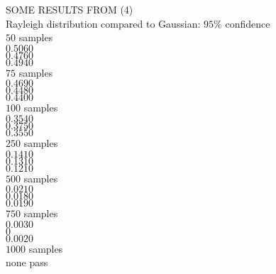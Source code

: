 \documentclass[12pt]{article}
\begin{document}
SOME RESULTS FROM (4)
\\Rayleigh distribution compared to Gaussian: $95\%$ confidence
\\$50$ samples
\\	$0.5060$
\\	$0.4760$
\\	$0.4940$
\\$75$ samples
\\	$0.4690$
\\	$0.4480$
\\	$0.4400$
\\$100$ samples
\\	$0.3540$
\\	$0.3750$
\\	$0.3550$
\\$250$ samples
\\	$0.1410$
\\	$0.1310$
\\	$0.1210$
\\$500$ samples
\\	$0.0210$
\\	$0.0180$
\\	$0.0190$
\\$750$ samples
\\	$0.0030$
\\	$0$
\\	$0.0020$
\\$1000$ samples
\\	none pass
\end{document}
